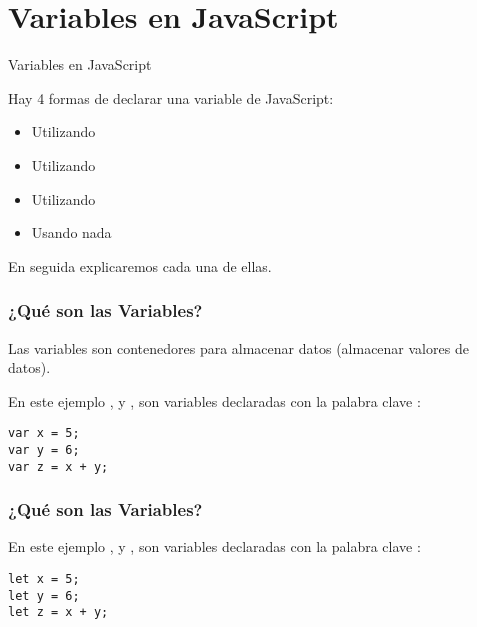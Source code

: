 
\section{Variables en JavaScript}

\begin{frame}[c]{Variables en JavaScript}

  Hay 4 formas de declarar una variable de JavaScript:

  \vspace{\baselineskip}
  \begin{itemize}
    \item Utilizando 
    \item Utilizando 
    \item Utilizando 
    \item Usando nada
  \end{itemize}

  \vspace{\baselineskip}
  En seguida explicaremos cada una de ellas.
\end{frame}

\begin{frame}[fragile]
  \frametitle{¿Qué son las Variables?}

  Las variables son contenedores para almacenar
  datos (almacenar valores de datos).

  \vspace{\baselineskip}
  En este ejemplo ,  y , son variables
  declaradas con la palabra clave :

  \vspace{\baselineskip}
  \begin{lstlisting}
var x = 5;
var y = 6;
var z = x + y;
  \end{lstlisting}
\end{frame}

\begin{frame}[fragile]
  \frametitle{¿Qué son las Variables?}

  En este ejemplo ,  y , son variables
  declaradas con la palabra clave :

  \vspace{\baselineskip}
  \begin{lstlisting}
let x = 5;
let y = 6;
let z = x + y;
  \end{lstlisting}
\end{frame}

